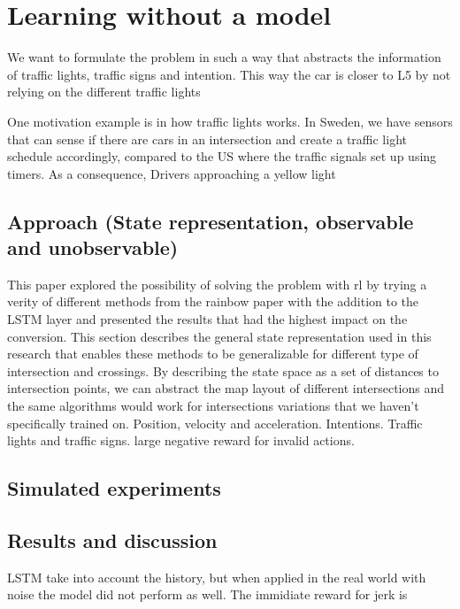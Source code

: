 \chapter{Learning without a model}
We want to formulate the problem in such a way that abstracts the information of traffic lights, traffic signs and intention. This way the car is closer to L5 by not relying on the different traffic lights

One motivation example is in how traffic lights works. In Sweden, we have sensors that can sense if there are cars in an intersection and create a traffic light schedule accordingly, compared to the US where the traffic signals set up using timers. As a consequence, Drivers approaching a yellow light 



\section{Approach (State representation, observable and unobservable)}
This paper explored the possibility of solving the problem with \gls{rl} by trying a verity of different methods from the rainbow paper with the addition to the LSTM layer and presented the results that had the highest impact on the conversion. 
This section describes the general state representation used in this research that enables these methods to be generalizable for different type of intersection and crossings. 
By describing the state space as a set of distances to intersection points, we can abstract the map layout of different intersections and the same algorithms would work for intersections variations that we haven't specifically trained on. 
Position, velocity and acceleration. 
Intentions. Traffic lights and traffic signs. 
large negative reward for invalid actions.
\section{Simulated experiments}
\section{Results and discussion}

LSTM take into account the history, but when applied in the real world with noise the model did not perform as well. 
The immidiate reward for jerk is 
